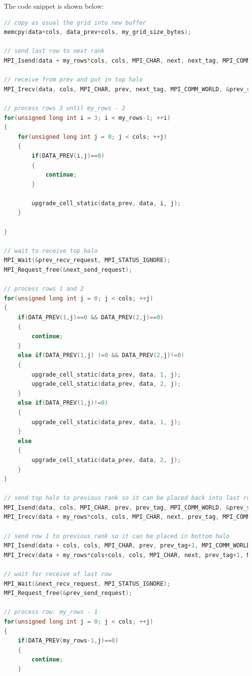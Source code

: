 \documentclass{report}
\begin{document}
The code snippet is shown below:

\begin{lstlisting}[language=C++]
// copy as usual the grid into new buffer
memcpy(data+cols, data_prev+cols, my_grid_size_bytes);

// send last row to next rank
MPI_Isend(data + my_rows*cols, cols, MPI_CHAR, next, next_tag, MPI_COMM_WORLD, &next_send_request);

// receive from prev and put in top halo
MPI_Irecv(data, cols, MPI_CHAR, prev, next_tag, MPI_COMM_WORLD, &prev_recv_request);

// process rows 3 until my_rows - 2
for(unsigned long int i = 3; i < my_rows-1; ++i)
{
    for(unsigned long int j = 0; j < cols; ++j)
    {
        if(DATA_PREV(i,j)==0)
        {
            continue;
        }

        upgrade_cell_static(data_prev, data, i, j);
    }

}

// wait to receive top halo
MPI_Wait(&prev_recv_request, MPI_STATUS_IGNORE);
MPI_Request_free(&next_send_request);

// process rows 1 and 2
for(unsigned long int j = 0; j < cols; ++j)
{
    if(DATA_PREV(1,j)==0 && DATA_PREV(2,j)==0)
    {
        continue;
    }
    else if(DATA_PREV(1,j) !=0 && DATA_PREV(2,j)!=0)
    {
        upgrade_cell_static(data_prev, data, 1, j);
        upgrade_cell_static(data_prev, data, 2, j);
    }
    else if(DATA_PREV(1,j)!=0)
    {
        upgrade_cell_static(data_prev, data, 1, j);
    }
    else
    {
        upgrade_cell_static(data_prev, data, 2, j);
    }
}
    
// send top halo to previous rank so it can be placed back into last row
MPI_Isend(data, cols, MPI_CHAR, prev, prev_tag, MPI_COMM_WORLD, &prev_send_request);
MPI_Irecv(data + my_rows*cols, cols, MPI_CHAR, next, prev_tag, MPI_COMM_WORLD, &next_recv_request);

// send row 1 to previous rank so it can be placed in bottom halo
MPI_Isend(data + cols, cols, MPI_CHAR, prev, prev_tag+1, MPI_COMM_WORLD, &prev_send_request1);
MPI_Irecv(data + my_rows*cols+cols, cols, MPI_CHAR, next, prev_tag+1, MPI_COMM_WORLD, &next_recv_request1);

// wait for receive of last row
MPI_Wait(&next_recv_request, MPI_STATUS_IGNORE);
MPI_Request_free(&prev_send_request);

// process row: my_rows - 1
for(unsigned long int j = 0; j < cols; ++j)
{
    if(DATA_PREV(my_rows-1,j)==0)
    {
        continue;
    }


\end{lstlisting}
\end{document}

